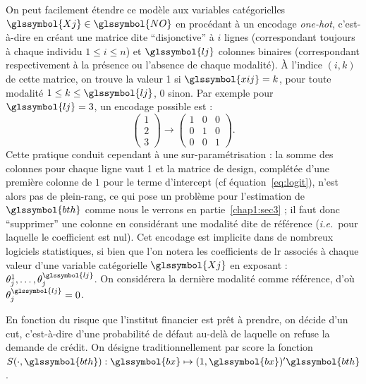 On peut facilement étendre ce modèle aux variables catégorielles $\glssymbol{Xj} \in \glssymbol{NO}$ en procédant à un encodage \textit{one-hot}, c'est-à-dire en créant une matrice dite ``disjonctive'' à $i$ lignes (correspondant toujours à chaque individu $1 \leq i \leq n$) et $\glssymbol{lj}$ colonnes binaires (correspondant respectivement à la présence ou l'absence de chaque modalité). \`A l'indice $(i,k)$ de cette matrice, on trouve la valeur 1 si $\glssymbol{xij} = k$, pour toute modalité $1 \leq k \leq \glssymbol{lj}$, 0 sinon. Par exemple pour $\glssymbol{lj}=3$, un encodage possible est :
$$ \left( \begin{array}{c} 1 \\ 2 \\ 3 \end{array} \right) \to \left( \begin{array}{ccc} 1 & 0 & 0 \\ 0 & 1 & 0 \\ 0 & 0 & 1 \end{array} \right).$$
Cette pratique conduit cependant à une sur-paramétrisation : la somme des colonnes pour chaque ligne vaut 1 et la matrice de design, complétée d'une première colonne de $1$ pour le terme d'intercept (cf équation~\eqref{eq:logit}), n'est alors pas de plein-rang, ce qui pose un problème pour l'estimation de $\glssymbol{bth}$ comme nous le verrons en partie~\ref{chap1:sec3} ; il faut donc ``supprimer'' une colonne en considérant une modalité dite de référence (\textit{i.e.}\ pour laquelle le coefficient est nul). Cet encodage est implicite dans de nombreux logiciels statistiques, si bien que l'on notera les coefficients de \gls{lr} associés à chaque valeur d'une variable catégorielle $\glssymbol{Xj}$ en exposant : $\theta_j^{1},\dots,\theta_j^{\glssymbol{lj}}$. On considérera la dernière modalité comme référence, d'où $\theta_j^{\glssymbol{lj}} = 0$.

En fonction du risque que l'institut financier est prêt à prendre, on décide d'un \gls{cut}, c'est-à-dire d'une probabilité de défaut au-delà de laquelle on refuse la demande de crédit. On désigne traditionnellement par \gls{score} la fonction $S(\cdot,\glssymbol{bth}): \glssymbol{bx} \mapsto (1,\glssymbol{bx})' \glssymbol{bth}$.

